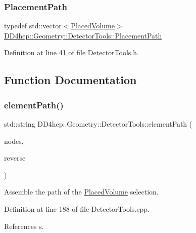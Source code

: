 \subsubsection{\texorpdfstring{Placement\+Path}{PlacementPath}}
{\footnotesize\ttfamily typedef std\+::vector$<$\hyperlink{class_d_d4hep_1_1_geometry_1_1_placed_volume}{Placed\+Volume}$>$ \hyperlink{namespace_d_d4hep_1_1_geometry_1_1_detector_tools_a6cc33285199e04dd336a33e6e62925e6}{D\+D4hep\+::\+Geometry\+::\+Detector\+Tools\+::\+Placement\+Path}}



Definition at line 41 of file Detector\+Tools.\+h.



\subsection{Function Documentation}
\hypertarget{namespace_d_d4hep_1_1_geometry_1_1_detector_tools_a57debfb96b86738cbde272df6791a644}{}\label{namespace_d_d4hep_1_1_geometry_1_1_detector_tools_a57debfb96b86738cbde272df6791a644} 
\subsubsection{\texorpdfstring{element\+Path()}{elementPath()}\hspace{0.1cm}{\footnotesize\ttfamily [1/7]}}
{\footnotesize\ttfamily std\+::string D\+D4hep\+::\+Geometry\+::\+Detector\+Tools\+::element\+Path (\begin{DoxyParamCaption}\item[{const \hyperlink{namespace_d_d4hep_1_1_geometry_1_1_detector_tools_a6cc33285199e04dd336a33e6e62925e6}{Placement\+Path} \&}]{nodes,  }\item[{bool}]{reverse }\end{DoxyParamCaption})}



Assemble the path of the \hyperlink{class_d_d4hep_1_1_geometry_1_1_placed_volume}{Placed\+Volume} selection. 



Definition at line 188 of file Detector\+Tools.\+cpp.



References s.



